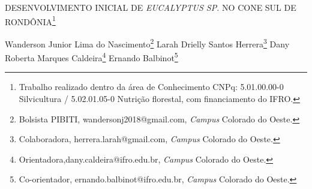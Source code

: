 \documentclass[article,12pt,onesidea,4paper,english,brazil]{abntex2}
\begin{document}
	
	
	\frenchspacing 
	
	\begin{center}
		\LARGE DESENVOLVIMENTO INICIAL DE \textit{EUCALYPTUS SP.} NO CONE SUL DE RONDÔNIA\footnote{Trabalho realizado dentro da área de Conhecimento CNPq: 5.01.00.00-0 Silvicultura / 5.02.01.05-0	Nutrição florestal, com financiamento do IFRO.}
		
		\normalsize
		Wanderson Junior Lima do Nascimento\footnote{Bolsista PIBITI, wandersonj2018@gmail.com, \textit{Campus} Colorado do Oeste.} 
		Larah Drielly Santos Herrera\footnote{Colaboradora, herrera.larah@gmail.com, \textit{Campus} Colorado do Oeste.} 
		Dany Roberta Marques Caldeira\footnote{Orientadora,dany.caldeira@ifro.edu.br, \textit{Campus} Colorado do Oeste.} 
		Ernando Balbinot\footnote{Co-orientador, ernando.balbinot@ifro.edu.br, \textit{Campus} Colorado do Oeste.} 
	\end{center}
	
\end{document}
